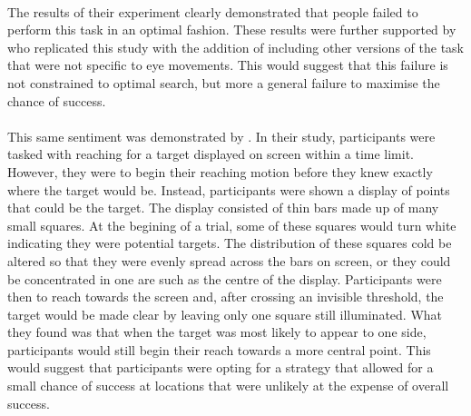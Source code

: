 \documentclass[12pt]{article}
\begin{document}
\paragraph{} The results of their experiment clearly demonstrated that people failed to perform this task in an optimal fashion. These results were further supported by \cite{clarke2015failure} who replicated this study with the addition of including other versions of the task that were not specific to eye movements. This would suggest that this failure is not constrained to optimal search, but more a general failure to maximise the chance of success. 

\paragraph{} This same sentiment was demonstrated by \cite{Hudson2007probmove}. In their study, participants were tasked with reaching for a target displayed on screen within a time limit. However, they were to begin their reaching motion before they knew exactly where the target would be. Instead, participants were shown a display of points that could be the target. The display consisted of thin bars made up of many small squares. At the begining of a trial, some of these squares would turn white indicating they were potential targets. The distribution of these squares cold be altered so that they were evenly spread across the bars on screen, or they could be concentrated in one are such as the centre of the display. Participants were then to reach towards the screen and, after crossing an invisible threshold, the target would be made clear by leaving only one square still illuminated. What they found was that when the target was most likely to appear to one side, participants would still begin their reach towards a more central point. This would suggest that participants were opting for a strategy that allowed for a small chance of success at locations that were unlikely at the expense of overall success. 
\end{document}
